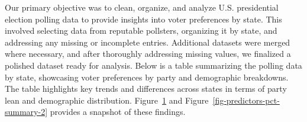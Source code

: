 \documentclass[
  letterpaper,
  DIV=11,
  numbers=noendperiod]{scrartcl}
\begin{document}
Our primary objective was to clean, organize, and analyze U.S.
presidential election polling data to provide insights into voter
preferences by state. This involved selecting data from reputable
pollsters, organizing it by state, and addressing any missing or
incomplete entries. Additional datasets were merged where necessary, and
after thoroughly addressing missing values, we finalized a polished
dataset ready for analysis. Below is a table summarizing the polling
data by state, showcasing voter preferences by party and demographic
breakdowns. The table highlights key trends and differences across
states in terms of party lean and demographic distribution.
Figure~\ref{fig-predictors-pct-summary-1} and
Figure~\ref{fig-predictors-pct-summary-2} provides a snapshot of these
findings.

\begin{figure}


\caption{\label{fig-predictors-pct-summary-1}}

\end{figure}%
\end{document}
